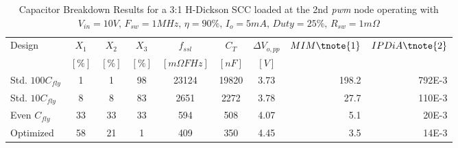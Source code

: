 \begin{table}[!h]
    \renewcommand{\arraystretch}{1.3}
    \begin{threeparttable}
    \centering
    \caption{Capacitor Breakdown Results for a 3:1 H-Dickson SCC loaded at the 2nd \emph{pwm} node operating with
             $V_{in} = 10V, \,  F_{sw} = 1MHz, \, \eta=90\%, \, I_o =5mA , \, Duty = 25\% , \, R_{sw}=1m \Omega$  }
    \label{tab:hscc_results}
    \begin{tabular}{ l | c | c | c || c | c | c || r | r }
      Design              & $X_1$   & $X_2$ & $X_3$   &  $f_{ssl}$          & $C_T$    & $\Delta V_{o,pp}$ & $ MIM\tnote{1} $  & $IPDiA \tnote{2}$ \\
                          &  $[\%]$ & $[\%]$ & $[\%]$ &  $[m\Omega F Hz]$  & $[nF]$    &     $[V]$            \\
                          \hline \hline
      Std. $100 C_{fly}$  &  1   &   1  &  98   &   23124     &  19820    &   3.73  & 198.2 &   792E-3   \\   \hline
      Std. $10 C_{fly}$   &  8   &   8  &  83   &    2651     &   2272    &   3.78  & 27.7  &   110E-3   \\    \hline
      Even $C_{fly}$      &  33  &  33  &  33   &     594     &    508    &   4.07  &  5.1  &   20E-3  \\      \hline
      Optimized           &  58  &  21  &  1    &     409     &    350    &   4.45  &  3.5  &   14E-3  \\

    \end{tabular}
    \end{threeparttable}
\end{table}
